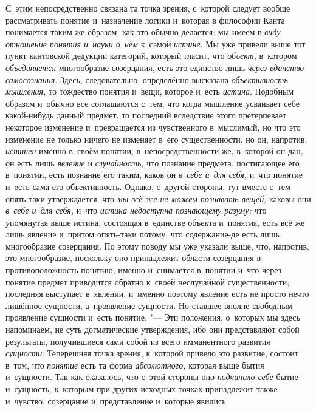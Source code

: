 С~этим непосредственно связана та точка зрения, с~которой
следует вообще рассматривать понятие и~назначение логики и~которая в
философии Канта понимается таким же образом, как это обычно делается: мы
имеем в {\em виду отношение понятия и~науки о~нём} к~самой {\em истине}. Мы уже
привели выше тот пункт кантовской дедукции категорий, который гласит, что
{\em объект,} в~котором {\em объединяется}
многообразие созерцания, есть это единство лишь
{\em через единство самосознания}. Здесь, следовательно, определённо высказана
{\em объективность мышления,} то тождество понятия и~вещи, которое и~есть
{\em истина}. Подобным
образом и~обычно все соглашаются с~тем, что когда мышление усваивает себе
какой-нибудь данный предмет, то последний вследствие этого претерпевает
некоторое изменение и~превращается из чувственного в~мыслимый, но что это
изменение не только ничего не изменяет в~его существенности, но он,
напротив, {\em истинен}
именно в~своём понятии, в~непосредственности же, в~которой он
дан, он есть лишь {\em явление} и {\em случайность;}
что познание предмета, постигающее его в~понятии, есть
познание его таким, каков он {\em в~себе
и~для себя,} и~что понятие и~есть сама его объективность.
Однако, с~другой стороны, тут вместе с~тем опять-таки
утверждается,
что {\em мы всё же не можем познавать вещей,} каковы они
{\em в~себе и~для себя,} и~что {\em истина
недоступна познающему разуму;} что упомянутая выше
истина, состоящая в~единстве объекта и~понятия, есть всё же
лишь явление и~притом опять-таки потому, что содержание-де есть лишь
многообразие созерцания. По этому поводу мы уже указали выше, что,
напротив, это многообразие, поскольку оно принадлежит области созерцания в
противоположность понятию, именно и~снимается в~понятии и~что через понятие
предмет приводится обратно к~своей неслучайной существенности; последняя
выступает в~явлении, и~именно поэтому явление есть не просто нечто лишённое
сущности, а~проявление сущности. Но ставшее вполне свободным проявление
сущности и~есть понятие. "--- Эти положения, о~которых мы здесь
напоминаем, не суть догматические утверждения, ибо они представляют собой
результаты, получившиеся сами собой из всего имманентного развития
{\em сущности}. Теперешняя точка зрения, к~которой привело это развитие,
состоит в~том, что {\em понятие} есть та форма {\em абсолютного,}
которая выше бытия и~сущности. Так как оказалось, что с~этой
стороны оно {\em подчинило себе}
бытие и~сущность, к~которым при других исходных точках
принадлежит также и~чувство, созерцание и~представление и~которые явились
